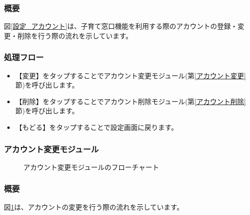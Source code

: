 \documentclass[a4j]{jarticle}
\begin{document}
\subsubsection*{概要}
図\ref{設定_アカウント}は、子育て窓口機能を利用する際のアカウントの登録・変更・削除を行う際の流れを示しています。
\subsubsection*{処理フロー}
\begin{itemize}
\item 【変更】をタップすることでアカウント変更モジュール(第\ref{アカウント変更}節)を呼び出します。
\item 【削除】をタップすることでアカウント削除モジュール(第\ref{アカウント削除}節)を呼び出します。
\item 【もどる】をタップすることで設定画面に戻ります。
\end{itemize}

\subsubsection{アカウント変更モジュール\label{アカウント変更}} %
\begin{figure}[H]
    \begin{center}
    \caption {アカウント変更モジュールのフローチャート}
    \label{設定_アカウント変更}
    \end{center}
\end{figure}
\subsubsection*{概要}
図\ref{設定_アカウント変更}は、アカウントの変更を行う際の流れを示しています。
\end{document}
